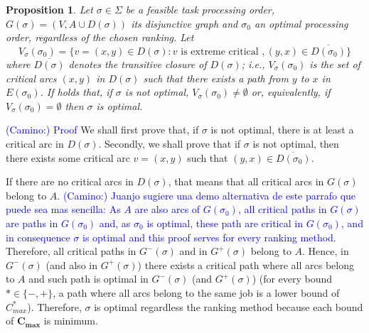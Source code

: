 \documentclass[preprint]{elsarticle}
\newcommand{\textcam}[1]{\textcolor{blue}{(Camino:) #1}}
\newtheorem{proposition}{Proposition}
\begin{document}
\begin{proposition}\label{propVs(s0)}
Let $\sigma \in \Sigma$ be a feasible task processing order, $G(\sigma) =(V, A \cup D(\sigma))$ its disjunctive graph and $\sigma_0$ an optimal processing order, regardless of the chosen ranking. Let
\begin{equation}
V_\sigma(\sigma_0) = \{v=(x,y) \in D(\sigma) : v \text{ is extreme critical }, (y,x) \in \overline{D(\sigma_0)} \}
\end{equation}
where $\overline{D(\sigma)}$ denotes the transitive closure of $D(\sigma)$; i.e., $V_\sigma(\sigma_0)$ is the set of critical arcs $(x,y)$ in $D(\sigma)$ such that there exists a path from $y$ to $x$ in $E(\sigma_0)$.
If holds that, if $\sigma$ is not optimal, $V_\sigma(\sigma_0) \neq \emptyset$ or, equivalently, if $V_\sigma(\sigma_0) = \emptyset$ then $\sigma$ is optimal.
\end{proposition}
\textcam{Proof}
We shall first prove that, if $\sigma$ is not optimal, there is at least a critical arc in $D(\sigma)$. Secondly, we shall prove that if $\sigma$ is not optimal, then there exists some critical arc $v=(x,y)$ such that $(y,x) \in \overline{D(\sigma_0)}$.

If there are no critical arcs in $D(\sigma)$, that means that all critical arcs in $G(\sigma)$ belong to $A$. \textcam{Juanjo sugiere una demo alternativa de este parrafo que puede sea mas sencilla: As $A$ are also arcs of $G(\sigma_0)$, all critical paths in $G(\sigma)$ are paths in $G(\sigma_0)$ and, as $\sigma_0$ is optimal, these path are critical in $G(\sigma_0)$, and in consequence $\sigma$ is optimal and this proof serves for every ranking method.} Therefore, all critical paths in $G^-(\sigma)$ and in $G^+(\sigma)$ belong to $A$. Hence, in $G^-(\sigma)$ (and also in $G^+(\sigma)$) there exists a critical path where all arcs belong to $A$ and such path is optimal in $G^-(\sigma)$ (and $G^+(\sigma)$) (for every bound $* \in \{-,+\}$, a path where all arcs belong to the same job is a lower bound of $C_{max}^*$). Therefore, $\sigma$ is optimal regardless the ranking method because each bound of $\mathbf{C_{max}}$ is minimum.
\end{document}

